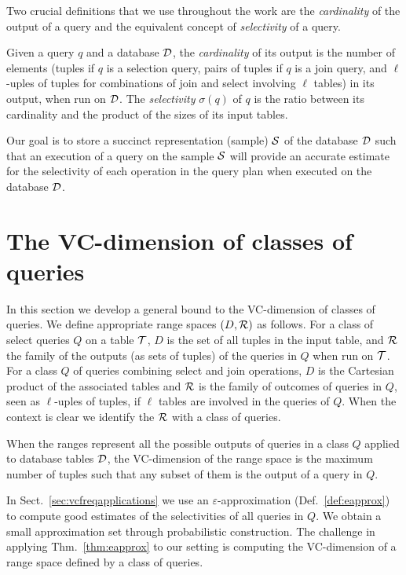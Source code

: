 Two crucial definitions that we use throughout the work are the 
\emph{cardinality} of the output of a query and the equivalent concept of
\emph{selectivity} of a query.

\begin{definition}\label{def:cardsel}
  Given a query $q$ and a database ${\cal D}$, the \emph{cardinality} of its output
  is the number of elements (tuples if $q$ is a selection query, pairs of
  tuples if $q$ is a join query, and $\ell$-uples of tuples for combinations of
  join and select involving $\ell$ tables) in its output, when run on ${\cal D}$. The
  \emph{selectivity} $\sigma(q)$ of $q$ is the ratio between its cardinality and
  the product of the sizes of its input tables.
 \end{definition}

Our goal is to store a succinct representation (sample) ${\cal S}$ of
the database ${\cal D}$ such that an execution of a query on the sample ${\cal S}$ will
provide an accurate estimate for the selectivity of
each operation in the query plan when executed on the database ${\cal D}$. 

\section{The VC-dimension of classes of queries}\label{sec:vcfreqvcdimqueries}
In this section we develop a general bound to the VC-dimension of classes of
queries. We define appropriate range spaces $(D,\mathcal{R})$ as follows. For a class
of select queries $Q$ on a table ${\cal T}$, $D$ is the set of all tuples in the
input table, and $\mathcal{R}$ the family of the outputs (as sets of tuples) of the
queries in $Q$ when run on ${\cal T}$. For a class $Q$ of queries combining select
and join operations, $D$ is the Cartesian product of the associated tables and
$\mathcal{R}$ is the family of outcomes of queries in $Q$, seen as $\ell$-uples of
tuples, if $\ell$ tables are involved in the queries of $Q$.  When the context
is clear we identify the $\mathcal{R}$ with a class of queries.

When the ranges represent all the possible outputs of queries in a class $Q$
applied to database tables ${\cal D}$, the VC-dimension of the range space is the maximum
number of tuples such that any subset of them is the output of a query in $Q$.

In Sect.~\ref{sec:vcfreqapplications} we use an
$\varepsilon$-approximation (Def.~\ref{def:eapprox}) to compute good estimates
of the selectivities of all queries in $Q$. We obtain a small approximation set
through probabilistic construction. The challenge in applying
Thm.~\ref{thm:eapprox} to our setting is computing the VC-dimension of a range
space defined by a class of queries.  

